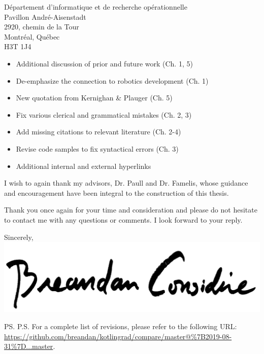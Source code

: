 \documentclass{letter}
\begin{document}
\begin{letter}{D\'epartement d'informatique et de recherche op\'erationnelle \\ Pavillon Andr\'e-Aisenstadt \\ 2920, chemin de la Tour \\ Montr\'eal, Qu\'ebec \\ H3T 1J4}
\begin{itemize}
                \begin{itemize}
                    \item Additional discussion of prior and future work (Ch. 1, 5)
                    \item De-emphasize the connection to robotics development (Ch. 1)
                    \item New quotation from Kernighan & Plauger (Ch. 5)
                    \item Fix various clerical and grammatical mistakes (Ch. 2, 3)
                    \item Add missing citations to relevant literature (Ch. 2-4)
                    \item Revise code samples to fix syntactical errors (Ch. 3)
                    \item Additional internal and external hyperlinks
                \end{itemize}
        \end{itemize}

        I wish to again thank my advisors, Dr. Paull and Dr. Famelis, whose guidance and encouragement have been integral to the construction of this thesis.

        Thank you once again for your time and consideration and please do not hesitate to contact me with any questions or comments. I look forward to your reply.

        \closing{Sincerely,\\
            \includegraphics[scale=0.06]{signature.png}\\
        }
        \ps{P.S. For a complete list of revisions, please refer to the following URL: \\
        {\footnotesize\url{https://github.com/breandan/kotlingrad/compare/master@\%7B2019-08-31\%7D...master}}.}
    \end{letter}
\end{document}

